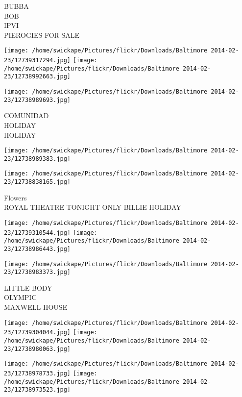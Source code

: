 \documentclass[10pt,letterpaper]{article}
\begin{document}
BUBBA\\
BOB\\
IPVI\\
PIEROGIES FOR SALE\\
\pagebreak

\texttt{[image: /home/swickape/Pictures/flickr/Downloads/Baltimore 2014-02-23/12739317294.jpg]}
\texttt{[image: /home/swickape/Pictures/flickr/Downloads/Baltimore 2014-02-23/12738992663.jpg]}

\texttt{[image: /home/swickape/Pictures/flickr/Downloads/Baltimore 2014-02-23/12738989693.jpg]}

COMUNIDAD\\
HOLIDAY\\
HOLIDAY\\
\pagebreak

\texttt{[image: /home/swickape/Pictures/flickr/Downloads/Baltimore 2014-02-23/12738989383.jpg]}

\vspace{0.25in}
\texttt{[image: /home/swickape/Pictures/flickr/Downloads/Baltimore 2014-02-23/12738838165.jpg]}

Flowers\\
ROYAL THEATRE TONIGHT ONLY BILLIE HOLIDAY\\
\pagebreak

\texttt{[image: /home/swickape/Pictures/flickr/Downloads/Baltimore 2014-02-23/12739310544.jpg]}
\texttt{[image: /home/swickape/Pictures/flickr/Downloads/Baltimore 2014-02-23/12738986443.jpg]}

\vspace{0.25in}
\texttt{[image: /home/swickape/Pictures/flickr/Downloads/Baltimore 2014-02-23/12738983373.jpg]}

LITTLE BODY\\
OLYMPIC\\
MAXWELL HOUSE\\
\pagebreak

\texttt{[image: /home/swickape/Pictures/flickr/Downloads/Baltimore 2014-02-23/12739304044.jpg]}
\texttt{[image: /home/swickape/Pictures/flickr/Downloads/Baltimore 2014-02-23/12738980063.jpg]}

\texttt{[image: /home/swickape/Pictures/flickr/Downloads/Baltimore 2014-02-23/12738978733.jpg]}
\texttt{[image: /home/swickape/Pictures/flickr/Downloads/Baltimore 2014-02-23/12738973523.jpg]}
\end{document}
